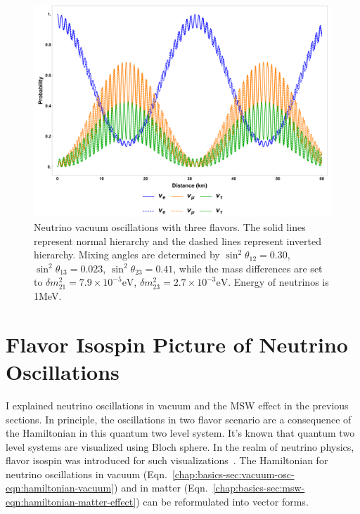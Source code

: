 \begin{figure}
    \centering
    \includegraphics[width=\textwidth]{chapters/assets/basics/vacuum-oscillations-3-flavor.pdf}
    \caption{Neutrino vacuum oscillations with three flavors. The solid lines represent normal hierarchy and the dashed lines represent inverted hierarchy. Mixing angles are determined by $\sin^2\theta_{12}=0.30$, $\sin^2\theta_{13}=0.023$, $\sin^2\theta_{23}=0.41$, while the mass differences are set to $\delta m_{21}^2 = 7.9\times 10^{-5}\mathrm{eV}$, $\delta m^2_{23}=2.7\times 10^{-3}\mathrm{eV}$. Energy of neutrinos is 1MeV.}
    \label{chap:basics-section:neutrinos-fig:vacuum-3-flavor-osc}
\end{figure}







\section{\label{chap:basics-sec:flavor-isospin-pic}Flavor Isospin Picture of Neutrino Oscillations}

I explained neutrino oscillations in vacuum and the MSW effect in the previous sections. In principle, the oscillations in two flavor scenario are a consequence of the Hamiltonian in this quantum two level system. It's known that quantum two level systems are visualized using Bloch sphere. In the realm of neutrino physics, flavor isospin was introduced for such visualizations~\cite{Duan2006b}. The Hamiltonian for neutrino oscillations in vacuum (Eqn.~\ref{chap:basics-sec:vacuum-osc-eqn:hamiltonian-vacuum}) and in matter (Eqn.~\ref{chap:basics-sec:msw-eqn:hamiltonian-matter-effect}) can be reformulated into vector forms.

